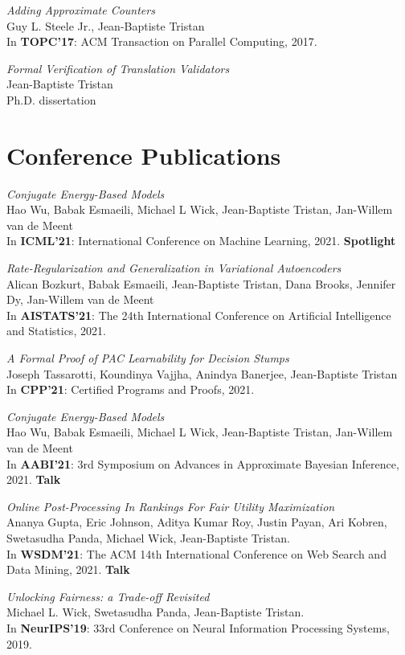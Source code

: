 \documentclass[margin,line]{res}
\begin{document}
\begin{resume}
\emph{Adding Approximate Counters}\\
Guy L. Steele Jr., Jean-Baptiste Tristan\\
In {\bf TOPC'17}: ACM Transaction on Parallel Computing, 2017.

\emph{Formal Verification of Translation Validators}\\
Jean-Baptiste Tristan\\
Ph.D. dissertation

\section{\sc Conference Publications}

\emph{Conjugate Energy-Based Models}\\
Hao Wu, Babak Esmaeili, Michael L Wick, Jean-Baptiste Tristan, Jan-Willem van de Meent\\
In {\bf ICML'21}: International Conference on Machine Learning, 2021. {\bf Spotlight}

\emph{Rate-Regularization and Generalization in Variational Autoencoders}\\
Alican Bozkurt, Babak Esmaeili, Jean-Baptiste Tristan, Dana Brooks, Jennifer Dy, Jan-Willem van de Meent\\
In {\bf AISTATS'21}: The 24th International Conference on
Artificial Intelligence and Statistics, 2021.

\emph{A Formal Proof of PAC Learnability for Decision Stumps}\\
Joseph Tassarotti, Koundinya Vajjha, Anindya Banerjee, Jean-Baptiste Tristan\\
In {\bf CPP'21}: Certified Programs and Proofs, 2021.

\emph{Conjugate Energy-Based Models}\\
Hao Wu, Babak Esmaeili, Michael L Wick, Jean-Baptiste Tristan, Jan-Willem van de Meent\\
In {\bf AABI'21}: 3rd Symposium on
Advances in Approximate Bayesian Inference, 2021. {\bf Talk}

\emph{Online Post-Processing In Rankings For Fair Utility Maximization}\\
Ananya Gupta, Eric Johnson, Aditya Kumar Roy, Justin Payan, Ari Kobren, Swetasudha Panda, Michael Wick, Jean-Baptiste Tristan.\\
In {\bf WSDM'21}: The ACM 14th International Conference on Web Search and Data Mining, 2021. {\bf Talk}

\emph{Unlocking Fairness: a Trade-off Revisited}\\
Michael L. Wick, Swetasudha Panda, Jean-Baptiste Tristan.\\
In {\bf NeurIPS'19}: 33rd Conference on Neural Information Processing Systems, 2019.


\end{resume}
\end{document}
